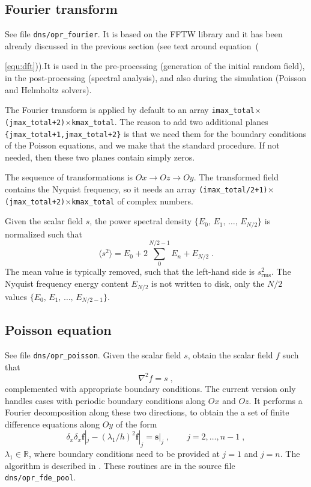 \subsection{Fourier transform}

See file {\tt dns/opr\_fourier}. It is based on the FFTW library and it has been already discussed in the previous section (see text around equation~({\ref{equ:dft})).It is used in the pre-processing (generation of the   initial random field), in the post-processing (spectral analysis), and also during the simulation (Poisson and Helmholtz solvers).

The Fourier transform is applied by default to an array {\tt imax\_total}$\times${\tt(jmax\_total+2)}$\times${\tt kmax\_total}. The reason to add two additional planes {\tt \{jmax\_total+1,jmax\_total+2\}} is that we need them for the boundary conditions of the Poisson equations, and we make that the standard procedure. If not needed, then these two planes contain simply zeros.

The sequence of transformations is $Ox\rightarrow Oz\rightarrow Oy$. The transformed field contains the Nyquist frequency, so it needs an array {\tt(imax\_total/2+1)}$\times${\tt(jmax\_total+2)}$\times${\tt kmax\_total} of complex numbers.

Given the scalar field $s$, the power spectral density $\{E_0,\,E_1,\,\ldots,\,E_{N/2}\}$ is normalized such that
\begin{equation}
\langle s^2\rangle = E_0+2\sum_0^{N/2-1}E_n+E_{N/2} \;.
\end{equation}
The mean value is typically removed, such that the left-hand side is $s^2_\text{rms}$. The Nyquist frequency energy content $E_{N/2}$ is not written to disk, only the $N/2$ values $\{E_0,\,E_1,\,\ldots,\,E_{N/2-1}\}$.

\subsection{Poisson equation}

See file {\tt dns/opr\_poisson}. Given the scalar field $s$, obtain the scalar field $f$ such that
\begin{equation}
  \nabla^2 f= s \;,
\end{equation}
complemented with appropriate boundary conditions.  The current version only handles cases with periodic boundary conditions along $Ox$ and $Oz$. It performs a Fourier decomposition along these two directions, to obtain the a set of finite difference equations along $Oy$ of the form
\begin{equation}
  \delta_x \delta_x \mathbf{f}|_j - (\lambda_1/h)^2\mathbf{f}|_j=\mathbf{s}|_j 
  \;,\qquad j=2,\ldots,n-1 \;,
\end{equation}
$\lambda_1\in\mathbb{R}$, where boundary conditions need to be provided at $j=1$ and $j=n$.  The algorithm is described in \cite{Mellado:2012}. These routines are in the source file {\tt dns/opr\_fde\_pool}.

}

